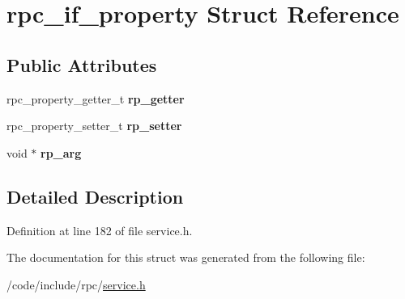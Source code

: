\hypertarget{structrpc__if__property}{}\section{rpc\+\_\+if\+\_\+property Struct Reference}
\label{structrpc__if__property}
\subsection*{Public Attributes}
\begin{DoxyCompactItemize}
\item 
rpc\+\_\+property\+\_\+getter\+\_\+t {\bfseries rp\+\_\+getter}\hypertarget{structrpc__if__property_a6b88200bb991311dae3c05e92dc16fdc}{}\label{structrpc__if__property_a6b88200bb991311dae3c05e92dc16fdc}

\item 
rpc\+\_\+property\+\_\+setter\+\_\+t {\bfseries rp\+\_\+setter}\hypertarget{structrpc__if__property_ab095fba7efd97b90f3440c2db5369f1e}{}\label{structrpc__if__property_ab095fba7efd97b90f3440c2db5369f1e}

\item 
void $\ast$ {\bfseries rp\+\_\+arg}\hypertarget{structrpc__if__property_a0171db6c0ee6ad206634d42de210ae52}{}\label{structrpc__if__property_a0171db6c0ee6ad206634d42de210ae52}

\end{DoxyCompactItemize}


\subsection{Detailed Description}


Definition at line 182 of file service.\+h.



The documentation for this struct was generated from the following file\+:\begin{DoxyCompactItemize}
\item 
/code/include/rpc/\hyperlink{service_8h}{service.\+h}\end{DoxyCompactItemize}
